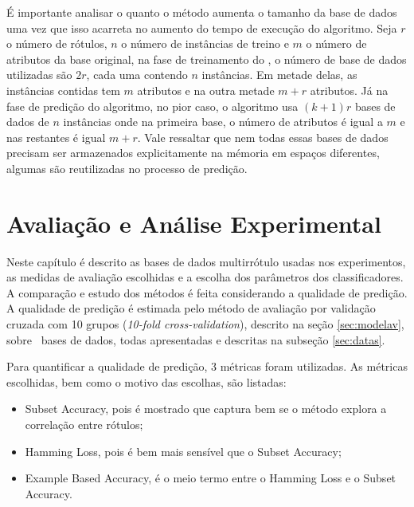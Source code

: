 \FloatBarrier


É importante analisar o quanto o método aumenta o tamanho da base de dados uma vez que isso acarreta no aumento
do tempo de execução do algoritmo. Seja $r$ o número de rótulos, $n$ o número de instâncias de treino
e $m$ o número de atributos da base original, na fase de treinamento do \MRLMa, o número de base de dados utilizadas são
$2r$, cada uma contendo $n$ instâncias. Em metade delas, as instâncias contidas tem $m$ atributos e na outra metade $m+r$ atributos.
Já na fase de predição do algoritmo, no pior caso, o algoritmo usa $(k+1)r$ bases de dados de $n$ instâncias onde na primeira base, o
número de atributos é igual a $m$ e nas restantes é igual $m+r$. Vale ressaltar que nem todas essas bases de dados precisam ser
armazenados explicitamente na mémoria em espaços diferentes, algumas são reutilizadas no processo de predição.





\chapter{Avaliação e Análise Experimental}
Neste capítulo é descrito as bases de dados multirrótulo usadas nos experimentos, 
as medidas de avaliação escolhidas e a escolha
dos parâmetros dos classificadores. 
A comparação e estudo dos métodos é feita considerando a qualidade de predição.
A qualidade de predição é estimada pelo método de avaliação
por validação cruzada com 10 grupos (\textit{10-fold cross-validation}), descrito na seção \ref{sec:modelav},
sobre \Nbases~bases de dados, todas apresentadas e descritas na subseção \ref{sec:datas}.

Para quantificar a qualidade de predição, 3 métricas foram utilizadas.
As métricas escolhidas, bem como o motivo das escolhas,
são listadas:
\begin{itemize}
 \item Subset Accuracy, pois é mostrado que captura bem se o método explora a correlação entre rótulos;
 \item Hamming Loss, pois é bem mais sensível que o Subset Accuracy;
 \item Example Based Accuracy, é o meio termo entre o Hamming Loss e o Subset Accuracy.
\end{itemize}

